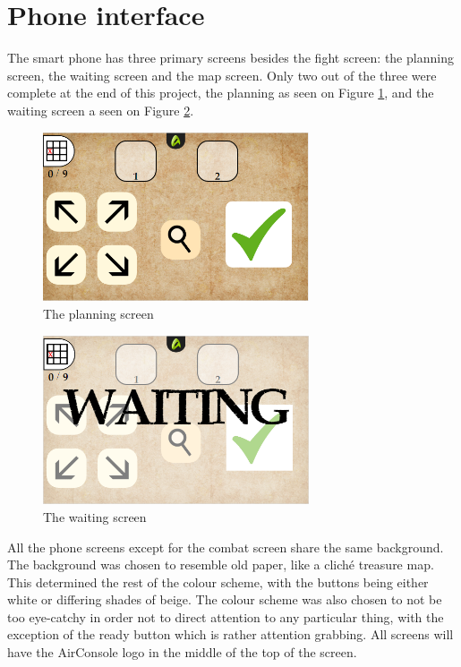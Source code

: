
\section{Phone interface}
The smart phone has three primary screens besides the fight screen: the planning screen, the waiting screen and the map screen. Only two out of the three were complete at the end of this project, the planning as seen on Figure \ref{fig:plan}, and the waiting screen a seen on Figure \ref{fig:wait}. 

\begin{figure}[h!]
	\centering
	\includegraphics[width=0.7\textwidth]{figures/planningScreen.png}
	\caption{The planning screen}
	\label{fig:plan}
\end{figure}


\begin{figure}[h!]
	\centering
	\includegraphics[width=0.7\textwidth]{figures/waitingScreen.png}
	\caption{The waiting screen}
	\label{fig:wait}
\end{figure}

All the phone screens except for the combat screen share the same background. The background was chosen to resemble old paper, like a cliché treasure map. This determined the rest of the colour scheme, with the buttons being either white or differing shades of beige. The colour scheme was also chosen to not be too eye-catchy in order not to direct attention to any particular thing, with the exception of the ready button which is rather attention grabbing. All screens will have the AirConsole logo in the middle of the top of the screen. 

